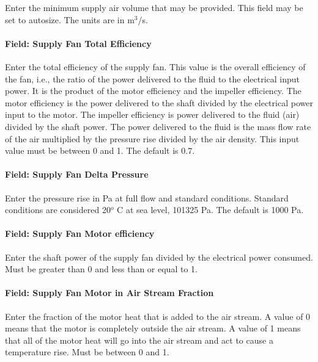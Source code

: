 Enter the minimum supply air volume that may be provided. This field may be set to autosize. The units are in m\(^{3}\)/s.

\paragraph{Field: Supply Fan Total Efficiency}\label{field-supply-fan-total-efficiency-8}

Enter the total efficiency of the supply fan. This value is the overall efficiency of the fan, i.e., the ratio of the power delivered to the fluid to the electrical input power. It is the product of the motor efficiency and the impeller efficiency. The motor efficiency is the power delivered to the shaft divided by the electrical power input to the motor. The impeller efficiency is power delivered to the fluid (air) divided by the shaft power. The power delivered to the fluid is the mass flow rate of the air multiplied by the pressure rise divided by the air density. This input value must be between 0 and 1. The default is 0.7.

\paragraph{Field: Supply Fan Delta Pressure}\label{field-supply-fan-delta-pressure-7}

Enter the pressure rise in Pa at full flow and standard conditions. Standard conditions are considered 20\(^{o}\) C at sea level, 101325 Pa. The default is 1000 Pa.

\paragraph{Field: Supply Fan Motor efficiency}\label{field-supply-fan-motor-efficiency-8}

Enter the shaft power of the supply fan divided by the electrical power consumed. Must be greater than 0 and less than or equal to 1.

\paragraph{Field: Supply Fan Motor in Air Stream Fraction}\label{field-supply-fan-motor-in-air-stream-fraction-4}

Enter the fraction of the motor heat that is added to the air stream. A value of 0 means that the motor is completely outside the air stream. A value of 1 means that all of the motor heat will go into the air stream and act to cause a temperature rise. Must be between 0 and 1.

